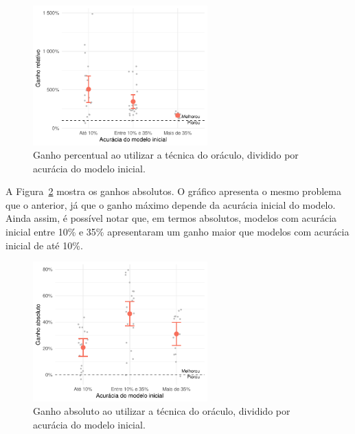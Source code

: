 \documentclass[12pt,twoside,brazilian]{book}
\begin{document}
\begin{figure}

{\centering \includegraphics[width=0.6\textwidth,height=\textheight]{./resultados_files/figure-pdf/fig-simulacao-geral-inicial-relativo-1.pdf}

}

\caption{\label{fig-simulacao-geral-inicial-relativo}Ganho percentual ao
utilizar a técnica do oráculo, dividido por acurácia do modelo inicial.}

\end{figure}

A Figura~\ref{fig-simulacao-geral-inicial-absoluto} mostra os ganhos
absolutos. O gráfico apresenta o mesmo problema que o anterior, já que o
ganho máximo depende da acurácia inicial do modelo. Ainda assim, é
possível notar que, em termos absolutos, modelos com acurácia inicial
entre 10\% e 35\% apresentaram um ganho maior que modelos com acurácia
inicial de até 10\%.

\begin{figure}

{\centering \includegraphics[width=0.6\textwidth,height=\textheight]{./resultados_files/figure-pdf/fig-simulacao-geral-inicial-absoluto-1.pdf}

}

\caption{\label{fig-simulacao-geral-inicial-absoluto}Ganho absoluto ao
utilizar a técnica do oráculo, dividido por acurácia do modelo inicial.}

\end{figure}
\end{document}
